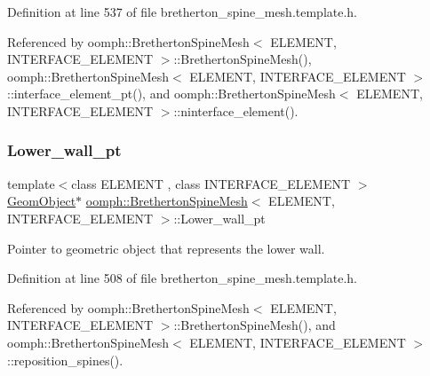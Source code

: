 Definition at line 537 of file bretherton\+\_\+spine\+\_\+mesh.\+template.\+h.



Referenced by oomph\+::\+Bretherton\+Spine\+Mesh$<$ E\+L\+E\+M\+E\+N\+T, I\+N\+T\+E\+R\+F\+A\+C\+E\+\_\+\+E\+L\+E\+M\+E\+N\+T $>$\+::\+Bretherton\+Spine\+Mesh(), oomph\+::\+Bretherton\+Spine\+Mesh$<$ E\+L\+E\+M\+E\+N\+T, I\+N\+T\+E\+R\+F\+A\+C\+E\+\_\+\+E\+L\+E\+M\+E\+N\+T $>$\+::interface\+\_\+element\+\_\+pt(), and oomph\+::\+Bretherton\+Spine\+Mesh$<$ E\+L\+E\+M\+E\+N\+T, I\+N\+T\+E\+R\+F\+A\+C\+E\+\_\+\+E\+L\+E\+M\+E\+N\+T $>$\+::ninterface\+\_\+element().

\mbox{\label{classoomph_1_1BrethertonSpineMesh_a04c0136de66c06a34347b89f453730e1}} 
\subsubsection{\texorpdfstring{Lower\+\_\+wall\+\_\+pt}{Lower\_wall\_pt}}
{\footnotesize\ttfamily template$<$class E\+L\+E\+M\+E\+NT , class I\+N\+T\+E\+R\+F\+A\+C\+E\+\_\+\+E\+L\+E\+M\+E\+NT $>$ \\
\hyperlink{classoomph_1_1GeomObject}{Geom\+Object}$\ast$ \hyperlink{classoomph_1_1BrethertonSpineMesh}{oomph\+::\+Bretherton\+Spine\+Mesh}$<$ E\+L\+E\+M\+E\+NT, I\+N\+T\+E\+R\+F\+A\+C\+E\+\_\+\+E\+L\+E\+M\+E\+NT $>$\+::Lower\+\_\+wall\+\_\+pt\hspace{0.3cm}{\ttfamily [protected]}}



Pointer to geometric object that represents the lower wall. 



Definition at line 508 of file bretherton\+\_\+spine\+\_\+mesh.\+template.\+h.



Referenced by oomph\+::\+Bretherton\+Spine\+Mesh$<$ E\+L\+E\+M\+E\+N\+T, I\+N\+T\+E\+R\+F\+A\+C\+E\+\_\+\+E\+L\+E\+M\+E\+N\+T $>$\+::\+Bretherton\+Spine\+Mesh(), and oomph\+::\+Bretherton\+Spine\+Mesh$<$ E\+L\+E\+M\+E\+N\+T, I\+N\+T\+E\+R\+F\+A\+C\+E\+\_\+\+E\+L\+E\+M\+E\+N\+T $>$\+::reposition\+\_\+spines().

\mbox{\label{classoomph_1_1BrethertonSpineMesh_a4ba20dfa61b6c342f2defbc0cdb47851}} 
